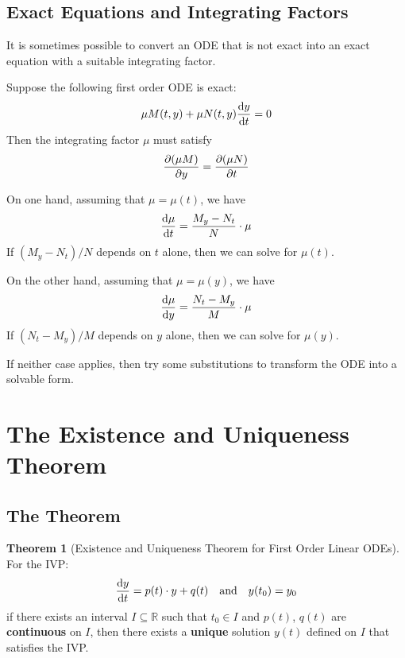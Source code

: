\documentclass[10pt,UTF8]{article}
\newenvironment{theoremBox}
{
  \begin{tcolorbox}[colback=yellow!5!white,colframe=yellow!75!black,parbox=false,before
  upper=\par,before lower=\par]}
  {
\end{tcolorbox}}
\theoremstyle{definition}
\newtheorem{definition inner}{Definition}[section]
\theoremstyle{definition}
\newtheorem{theorem inner}{Theorem}[section]
\newenvironment{theorem}[1][]
{
  \begin{theoremBox}
  \begin{theorem inner}[#1]\hfill\par}
    {
    \end{theorem inner}
\end{theoremBox}}
\theoremstyle{definition}
\newtheorem*{proof inner}{\textit{Proof}}
\theoremstyle{plain}
\newtheorem{tip inner}{Tip}[section]
\theoremstyle{remark}
\begin{document}
\subsection{Exact Equations and Integrating Factors}

It is sometimes possible to convert an ODE that is not exact into an
exact equation with a suitable integrating factor.

Suppose the following first order ODE is exact:
\begin{equation*}
  \mu M(t,y) + \mu N(t,y)\dv{y}{t} = 0
\end{equation*}
Then the integrating factor \( \mu \) must satisfy
\begin{equation*}
  \pdv{(\mu M)}{y} = \pdv{(\mu N)}{t}
\end{equation*}

On one hand, assuming that \( \mu = \mu(t) \), we have
\begin{equation*}
  \dv{\mu}{t} = \frac{M_y - N_t}{N}\cdot \mu
\end{equation*}
If \((M_y - N_t) / N\) depends on \(t\) alone, then we can solve for \(\mu(t)\).

On the other hand, assuming that \( \mu = \mu(y) \), we have
\begin{equation*}
  \dv{\mu}{y} = \frac{N_t - M_y}{M}\cdot \mu
\end{equation*}
If \((N_t - M_y) / M\) depends on \(y\) alone, then we can solve for \(\mu(y)\).

If neither case applies, then try some substitutions to transform the
ODE into a solvable form.

\section{The Existence and Uniqueness Theorem}

\subsection{The Theorem}

\begin{theorem}[Existence and Uniqueness Theorem for First Order Linear ODEs]
  For the IVP\@:
  \begin{equation*}
    \dv{y}{t} = p(t)\cdot y + q(t) \qand y(t_0) = y_0
  \end{equation*}
  if there exists an interval \(I \subseteq \mathbb{R}\) such that
  \(t_0 \in I\) and \(p(t)\), \(q(t)\) are \textbf{continuous} on \(I\),
  then there exists a \textbf{unique} solution \(y(t)\) defined on \(I\)
  that satisfies the IVP\@.
\end{theorem}
\end{document}
